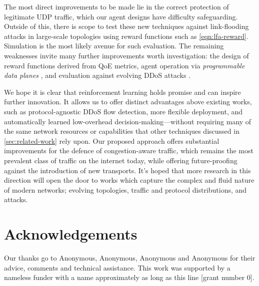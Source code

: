 \documentclass[10pt, times, conference, letterpaper]{IEEEtran}
\begin{document}
The most direct improvements to be made lie in the correct protection of legitimate UDP traffic, which our agent designs have difficulty safeguarding.
Outside of this, there is scope to test these new techniques against link-flooding attacks in large-scale topologies using reward functions such as \cref{eqn:lfa-reward}.
Simulation is the most likely avenue for such evaluation.
The remaining weaknesses invite many further improvements worth investigation: the design of reward functions derived from QoE metrics, agent operation via \emph{programmable data planes} \cite{DBLP:conf/ancs/JouetP17}, and evaluation against evolving DDoS attacks \cite{DBLP:conf/spw/KangGS16}.

We hope it is clear that reinforcement learning holds promise and can inspire further innovation.
It allows us to offer distinct advantages above existing works, such as protocol-agnostic DDoS flow detection, more flexible deployment, and automatically learned low-overhead decision-making---without requiring many of the same network resources or capabilities that other techniques discussed in \cref{sec:related-work} rely upon.
Our proposed approach offers substantial improvements for the defence of congestion-aware traffic, which remains the most prevalent class of traffic on the internet today, while offering future-proofing against the introduction of new transports.
It's hoped that more research in this direction will open the door to works which capture the complex and fluid nature of modern networks; evolving topologies, traffic and protocol distributions, and attacks.

\section*{Acknowledgements}
Our thanks go to Anonymous, Anonymous, Anonymous and Anonymous for their advice, comments and technical assistance.
This work was supported by a nameless funder with a name approximately as long as this line [grant number 0].

\renewcommand*{\bibfont}{\footnotesize}
\printbibliography
\end{document}
